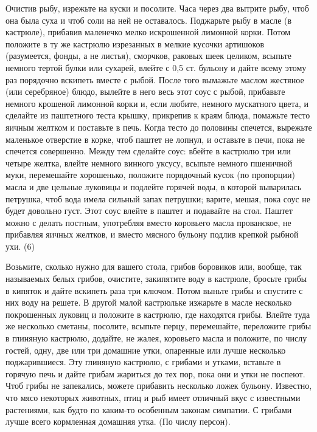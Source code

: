 Очистив рыбу, изрежьте на куски и посолите. Часа через два вытрите рыбу, чтоб она была суха и чтоб соли на ней не оставалось. Поджарьте рыбу в масле (в кастрюле), прибавив маленечко мелко искрошенной лимонной корки. Потом положите в ту же кастрюлю изрезанных в мелкие кусочки артишоков (разумеется, фонды, а не листья), сморчков, раковых шеек целиком, всыпьте немного тертой булки или сухарей, влейте с 0,5 ст. бульону и дайте всему этому раз порядочно вскипеть вместе с рыбой. После того вымажьте маслом жестяное (или серебряное) блюдо, вылейте в него весь этот соус с рыбой, прибавьте немного крошеной лимонной корки и, если любите, немного мускатного цвета, и сделайте из паштетного теста крышку, прикрепив к краям блюда, помажьте тесто яичным желтком и поставьте в печь. Когда тесто до половины спечется, вырежьте маленькое отверстие в корке, чтоб паштет не лопнул, и оставьте в печи, пока не спечется совершенно. Между тем сделайте соус: вбейте в кастрюлю три или четыре желтка, влейте немного винного уксусу, всыпьте немного пшеничной муки, перемешайте хорошенько, положите порядочный кусок (по пропорции) масла и две цельные луковицы и подлейте горячей воды, в которой выварилась петрушка, чтоб вода имела сильный запах петрушки; варите, мешая, пока соус не будет довольно густ. Этот соус влейте в паштет и подавайте на стол. Паштет можно с делать постным, употребляя вместо коровьего масла прованское, не прибавляя яичных желтков, и вместо мясного бульону подлив крепкой рыбной ухи. (6) 


Возьмите, сколько нужно для вашего стола, грибов боровиков или, вообще, так называемых белых грибов, очистите, закипятите воду в кастрюле, бросьте грибы в кипяток и дайте вскипеть раза три ключом. Потом выньте грибы и спустите с них воду на решете. В другой малой кастрюльке изжарьте в масле несколько покрошенных луковиц и положите в кастрюлю, где находятся грибы. Влейте туда же несколько сметаны, посолите, всыпьте перцу, перемешайте, переложите грибы в глиняную кастрюлю, додайте, не жалея, коровьего масла и положите, по числу гостей, одну, две или три домашние утки, опаренные или лучше несколько поджарившиеся. Эту глиняную кастрюлю, с грибами и утками, вставьте в горячую печь и дайте грибам жариться до тех пор, пока они и утки не поспеют. Чтоб грибы не запекались, можете прибавить несколько ложек бульону. Известно, что мясо некоторых животных, птиц и рыб имеет отличный вкус с известными растениями, как будто по каким-то особенным законам симпатии. С грибами лучше всего кормленная домашняя утка. (По числу персон). 

